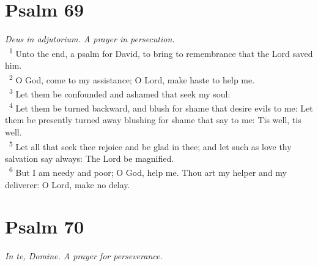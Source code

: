 \documentclass[a5paper,12pt]{article}
\begin{document}
\begin{multicols*}{2}
\section{Psalm 69}
\label{sec:org1313ce2}
\emph{Deus in adjutorium. A prayer in persecution.}\\

~\textsuperscript{1} Unto the end, a psalm for David, to bring to remembrance that the Lord saved him.\\
~\textsuperscript{2} O God, come to my assistance; O Lord, make haste to help me.\\
~\textsuperscript{3} Let them be confounded and ashamed that seek my soul:\\
~\textsuperscript{4} Let them be turned backward, and blush for shame that desire evils to me: Let them be presently turned away blushing for shame that say to me: Tis well, tis well.\\
~\textsuperscript{5} Let all that seek thee rejoice and be glad in thee; and let such as love thy salvation say always: The Lord be magnified.\\
~\textsuperscript{6} But I am needy and poor; O God, help me. Thou art my helper and my deliverer: O Lord, make no delay.\\

\section{Psalm 70}
\label{sec:org8955ab9}
\emph{In te, Domine. A prayer for perseverance.}\\


\end{multicols*}
\end{document}
